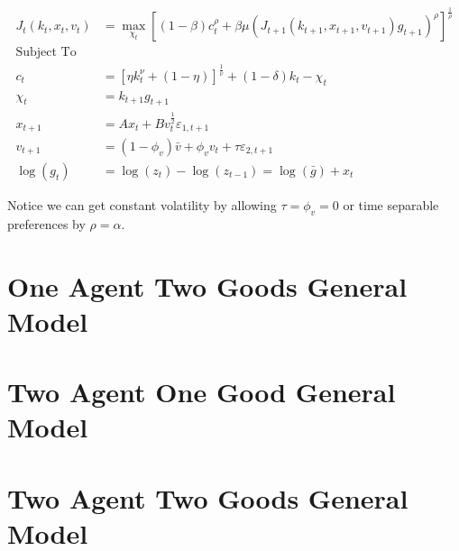 \documentclass[10pt]{article}
\begin{document}
  \begin{align*}
    J_t(k_t, x_t, v_t) &= \max_{\chi_{t}} \left[(1 - \beta) c_t^{\rho} + \beta \mu(J_{t+1}(k_{t+1}, x_{t+1}, v_{t+1}) g_{t+1})^{\rho} \right]^{\frac1\rho} \\
    \text{Subject To }& \\
    c_t &= \left[ \eta k_{t}^{\nu} + (1 - \eta) \right]^{\frac1\nu} + (1 - \delta) k_t - \chi_t \\
    \chi_t &= k_{t+1} g_{t+1} \\
    x_{t+1} &= A x_{t} + B v_{t}^{\frac{1}{2}} \varepsilon_{1, t+1} \\
    v_{t+1} &= (1 - \phi_v) \bar{v} + \phi_v v_{t} + \tau \varepsilon_{2, t+1} \\
    \log(g_t) &= \log(z_t) - \log(z_{t-1}) = \log(\bar{g}) + x_t
  \end{align*}

  Notice we can get constant volatility by allowing $\tau = \phi_v = 0$ or time separable preferences by $\rho = \alpha$.

\section{One Agent Two Goods General Model}

\section{Two Agent One Good General Model}

\section{Two Agent Two Goods General Model}
\end{document}
